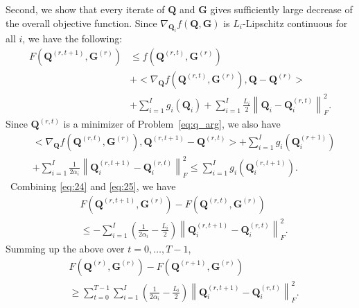 \documentclass[10pt,journal]{IEEEtran}
\newcommand{\G}{\boldsymbol{G}}
\newcommand{\Q}{\boldsymbol{Q}}
\begin{document}
\bigskip

Second, we show that every iterate of $\Q$ and $\G$ gives sufficiently large decrease of the overall objective function.
Since $\nabla_{\Q_i}f(\Q,\G)$ is $L_i$-Lipschitz continuous for all $i$, we have the following:
\begin{align}
F(\Q^{(r,t+1)},\G^{(r)})&\leq f(\Q^{(r,t)},\G^{(r)}) \label{eq:24} \\
&+  <\nabla_{\Q}f(\Q^{(r,t)},\G^{(r)}),\Q -\Q^{(r)}> \nonumber\\
&  + \sum_{i=1}^Ig_i(\Q_i) + \sum_{i=1}^I\frac{L_i}{2}\left\|\Q_i-\Q_i^{(r,t)}\right\|_F^2. \nonumber
\end{align}
Since $\Q^{(r,t)}$ is a minimizer of Problem~\eqref{eq:q_arg}, we also have
\begin{align}\label{eq:25}
 &<\nabla_{\Q}f(\Q^{(r,t)},\G^{(r)}),\Q^{(r,t+1)} -\Q^{(r,t)}>+\sum_{i=1}^Ig_i(\Q_i^{(r+1)}) \nonumber\\
  &+ \sum_{i=1}^I\frac{1}{2\alpha_i}\left\|\Q_i^{(r,t+1)}-\Q_i^{(r,t)}\right\|_F^2 \leq  \sum_{i=1}^Ig_i(\Q_i^{(r,t+1)}).
\end{align}
\
Combining \eqref{eq:24} and \eqref{eq:25}, we have
\begin{equation}\label{eq:suff_q0}
\begin{aligned}
&F(\Q^{(r,t+1)},\G^{(r)}) - F(\Q^{(r,t)},\G^{(r)}) \\
& \leq -\sum_{i=1}^I\left( \frac{1}{2\alpha_i} - \frac{L_i}{2} \right)\left\|\Q_i^{(r,t+1)}-\Q_i^{(r,t)}\right\|_F^2.
\end{aligned}
\end{equation}
Summing up the above over $t=0,\ldots,T-1$, %
\begin{equation}\label{eq:suff_q}
\begin{aligned}
& F(\Q^{(r)},\G^{(r)}) - F(\Q^{(r+1)},\G^{(r)})\\
&\geq \sum_{t=0}^{T-1}\sum_{i=1}^I\left( \frac{1}{2\alpha_i} - \frac{L_i}{2} \right)\left\|\Q_i^{(r,t+1)}-\Q_i^{(r,t)}\right\|_F^2.
\end{aligned}
\end{equation}
\end{document}
